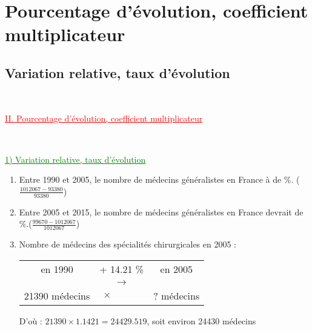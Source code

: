 \documentclass[xcolor={dvipsnames}]{beamer}
\begin{document}
\section{Pourcentage d'évolution, coefficient multiplicateur}

\subsection{Variation relative, taux d'évolution}




\begin{frame}
\

\begin{Large}
	\textcolor{Red}{\underline{II. Pourcentage d'évolution, coefficient multiplicateur }}
\end{Large}\pause
\

\vspace*{1cm}

\textcolor{Green}{\underline{1) Variation relative, taux d'évolution}}
\end{frame}



\begin{frame}{}
\begin{enumerate}%
	\item Entre 1990 et 2005, le nombre de médecins généralistes en France à  de  \%. ($\frac{\num{1012067} - \num{93380}}{\num{93380}}$)\pause
	
	\item Entre 2005 et 2015, le nombre de médecins généralistes en France devrait  de  \%.($\frac{\num{99670} - \num{1012067}}{\num{1012067}}$)\pause
	
	\item Nombre de médecins des spécialités chirurgicales en 2005 : 
	
	\begin{table}[h!]
		\centering
		\begin{tabular}{|ccc|}
			\hline
			en \num{1990} & + \num{14.21} \%  & en \num{2005} \\
			& {\LARGE $\rightarrow$} &			\\
			\num{21390} médecins&   $ \times \qquad \quad $  & ? médecins \\
			\hline
		\end{tabular}
	\end{table}\pause
	
	D'où : $\num{21390} \times \num{1.1421} = \num{24429.519}$, soit environ \num{24430} médecins
	
\end{enumerate}
\end{frame}
\end{document}

